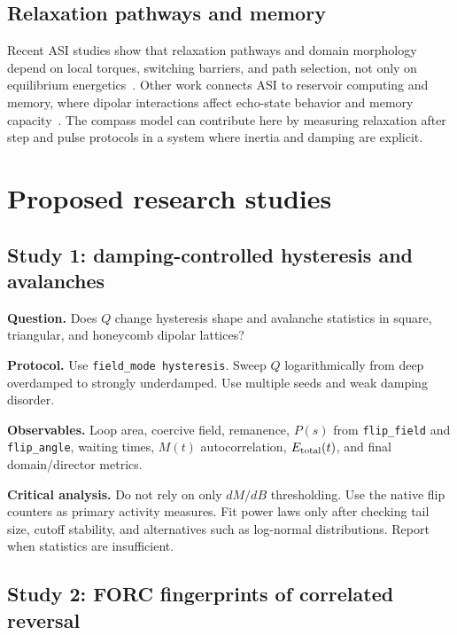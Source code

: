 \documentclass[11pt,a4paper]{article}
\newcommand{\code}[1]{\texttt{#1}}
\begin{document}
\subsection{Relaxation pathways and memory}

Recent ASI studies show that relaxation pathways and domain morphology depend on local torques, switching barriers, and path selection, not only on equilibrium energetics~\cite{menniti2025}. Other work connects ASI to reservoir computing and memory, where dipolar interactions affect echo-state behavior and memory capacity~\cite{taniguchi2025}. The compass model can contribute here by measuring relaxation after step and pulse protocols in a system where inertia and damping are explicit.

\section{Proposed research studies}
\label{sec:studies}

\subsection{Study 1: damping-controlled hysteresis and avalanches}

\textbf{Question.} Does $Q$ change hysteresis shape and avalanche statistics in square, triangular, and honeycomb dipolar lattices?

\textbf{Protocol.} Use \code{field\_mode hysteresis}. Sweep $Q$ logarithmically from deep overdamped to strongly underdamped. Use multiple seeds and weak damping disorder.

\textbf{Observables.} Loop area, coercive field, remanence, $P(s)$ from \code{flip\_field} and \code{flip\_angle}, waiting times, $M(t)$ autocorrelation, $E_{\rm total}(t)$, and final domain/director metrics.

\textbf{Critical analysis.} Do not rely on only $dM/dB$ thresholding. Use the native flip counters as primary activity measures. Fit power laws only after checking tail size, cutoff stability, and alternatives such as log-normal distributions. Report when statistics are insufficient.

\subsection{Study 2: FORC fingerprints of correlated reversal}
\end{document}
